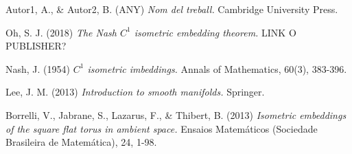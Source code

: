 \documentclass[11pt,a4paper,openright,oneside]{book}
\numberwithin{equation}{section}
\theoremstyle{definition}
\begin{document}
\begin{thebibliography}{25}

{ \color{blue} 
Autor1, A., \& Autor2, B. (ANY)
\newblock \textit{Nom del treball.}
\newblock Cambridge University Press.
}

Oh, S. J. (2018)
\newblock \textit{The Nash $C^1$ isometric embedding theorem.}
\newblock LINK O PUBLISHER?

Nash, J. (1954)
\newblock \textit{$C^1$ isometric imbeddings.}
\newblock Annals of Mathematics, 60(3), 383-396.

Lee, J. M. (2013)
\newblock \textit{Introduction to smooth manifolds.}
\newblock Springer.

Borrelli, V., Jabrane, S., Lazarus, F., \& Thibert, B. (2013)
\newblock \textit{Isometric embeddings of the square flat torus in ambient space.}
\newblock Ensaios Matemáticos (Sociedade Brasileira de Matemática), 24, 1-98.

\end{thebibliography}
\end{document}
